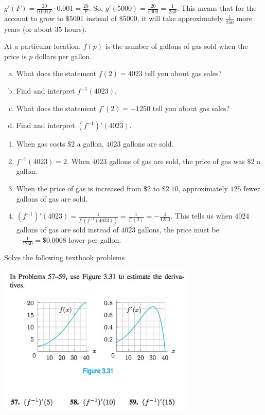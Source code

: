 \documentclass[11pt]{exam}
\begin{document}
\begin{questions}
\begin{solution}
    \(g'(F) =
    \frac{20}{0.001 F} \cdot 0.001 = \frac{20}{F}\). So, \(g'(5000) =
    \frac{20}{5000} = \frac{1}{250}\). This means that for the account
    to grow to \(\$5001\) instead of \(\$5000\), it will take
    approximately \(\frac{1}{250}\) more years (or about \(35\) hours).
  \end{solution}
\question At a particular location, \(f(p)\) is the number of gallons
  of gas sold when the price is \(p\) dollars per gallon.
  \begin{enumerate}[(a)]
  \item What does the statement \(f(2) = 4023\) tell you about gas sales?
  \item Find and interpret \(f^{-1}(4023)\).
  \item What does the statement \(f'(2) = -1250\) tell you about gas sales?
  \item Find and interpret \((f^{-1})'(4023)\).
  \end{enumerate}
  \begin{solution}
    \begin{enumerate}
    \item When gas costs \(\$2\) a gallon, \(4023\) gallons are sold.
    \item \(f^{-1}(4023) = 2\). When \(4023\) gallons of gas are sold, the
      price of gas was \(\$2\) a gallon.
    \item When the price of gas is increased from \(\$2\) to
      \(\$2.10\), approximately \(125\) fewer gallons of gas are sold.
    \item \((f^{-1})'(4023) = \frac{1}{f'(f^{-1}(4023))} =
      \frac{1}{f'(2)} = -\frac{1}{1250}\). This tells us when \(4024\)
      gallons of gas are sold instead of \(4023\) gallons, the price
      must be \(-\frac{1}{1250} = \$0.0008\) lower per gallon.
    \end{enumerate}
  \end{solution}
  \pagebreak
\question Solve the following textbook problems \\
  \vspace{-0.3in}
  \begin{multicols}{2}
\hspace*{-1cm}\includegraphics[width=3.7in]{Figures/no57to59.jpg}



\end{multicols}
\end{questions}
\end{document}

